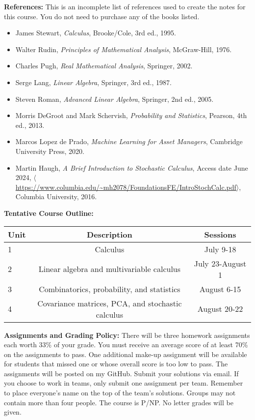 \documentclass[11pt, a4paper]{article}
\begin{document}
\noindent\textbf{References:} %
This is an incomplete list of references used to create the notes for this course. You do not need to purchase any of the books listed.  
\begin{itemize}
\item James Stewart, {\textit{Calculus}}, Brooke/Cole, 3rd ed., 1995.
\item Walter Rudin, {\textit{Principles of Mathematical Analysis}}, McGraw-Hill, 1976.
\item Charles Pugh, {\textit{Real Mathematical Analysis}}, Springer, 2002.
\item Serge Lang, {\textit{Linear Algebra}}, Springer, 3rd ed., 1987.
\item Steven Roman, {\textit{Advanced Linear Algebra}}, Springer, 2nd ed., 2005.
\item Morris DeGroot and Mark Schervish, {\textit{Probability and Statistics}}, Pearson, 4th ed., 2013.
\item Marcos Lopez de Prado, {\textit{Machine Learning for Asset Managers}}, Cambridge University Press, 2020.
\item  Martin Haugh,  {\textit{A Brief Introduction to Stochastic Calculus}}, Access date June 2024, $\langle$\url{https://www.columbia.edu/~mh2078/FoundationsFE/IntroStochCalc.pdf}$\rangle$, Columbia University, 2016. 
\end{itemize} 




\vspace*{.15in}

\noindent \textbf{Tentative Course Outline:}
\begin{center}

\begin{tabular}{| l | c | c| }
\hline
{\bf Unit}	&	{\bf Description}						&	{\bf Sessions}\\\hline
1		& 	Calculus								&	July 9-18\\
2		&	 Linear algebra and multivariable calculus		&	July 23-August 1\\
3		&	Combinatorics, probability, and statistics		&	August 6-15\\
4		&	Covariance matrices, PCA, and stochastic calculus&	 August 20-22\\\hline
\end{tabular}
\end{center}

\vspace*{.15in}
\noindent\textbf{Assignments and Grading Policy:} 
There will be three homework assignments each worth 33\% of your grade. You must receive an average score of at least 70\% on the assignments to pass. One additional make-up assignment will be available for students that missed one or whose overall score is too low to pass. The assignments will be posted on my GitHub. Submit your solutions via email. If you choose to work in teams, only submit one assignment per team. Remember to place everyone's name on the top of the team's solutions. Groups may not contain more than four people. The course is P/NP. No letter grades will be given. 

\end{document}
